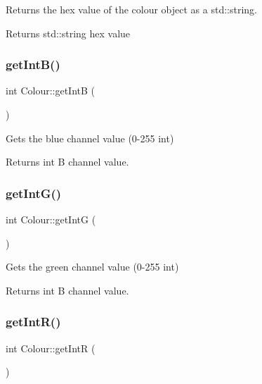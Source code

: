 Returns the hex value of the colour object as a std\+::string. 

\begin{DoxyReturn}{Returns}
std\+::string hex value 
\end{DoxyReturn}
\mbox{\label{classColour_a01d2ae35756ace52645d02be5ca001e0}} 
\subsubsection{\texorpdfstring{get\+Int\+B()}{getIntB()}}
{\footnotesize\ttfamily int Colour\+::get\+IntB (\begin{DoxyParamCaption}{ }\end{DoxyParamCaption})\hspace{0.3cm}{\ttfamily [inline]}}



Gets the blue channel value (0-\/255 int) 

\begin{DoxyReturn}{Returns}
int B channel value. 
\end{DoxyReturn}
\mbox{\label{classColour_a417a9c415589e6bb1163ca2e264ccb61}} 
\subsubsection{\texorpdfstring{get\+Int\+G()}{getIntG()}}
{\footnotesize\ttfamily int Colour\+::get\+IntG (\begin{DoxyParamCaption}{ }\end{DoxyParamCaption})\hspace{0.3cm}{\ttfamily [inline]}}



Gets the green channel value (0-\/255 int) 

\begin{DoxyReturn}{Returns}
int B channel value. 
\end{DoxyReturn}
\mbox{\label{classColour_a3ac86075f6a02085c2d80c6648409f01}} 
\subsubsection{\texorpdfstring{get\+Int\+R()}{getIntR()}}
{\footnotesize\ttfamily int Colour\+::get\+IntR (\begin{DoxyParamCaption}{ }\end{DoxyParamCaption})\hspace{0.3cm}{\ttfamily [inline]}}



